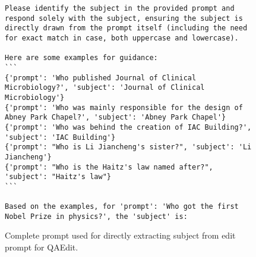 \renewcommand{\fcolorbox}[4][]{#4} %
\begin{figure*}[t]
    \begin{tcolorbox}[
    right=5pt, left=5pt, top=5pt, bottom=5pt,
    toptitle=1mm, bottomtitle=1mm,
    colback=white,
    coltitle=white,
    colbacktitle=matisse,
    colframe=matisse,
    title=Prompt for Subject Extraction, center title]
    \begin{verbatim}
Please identify the subject in the provided prompt and respond solely with the subject, ensuring the subject is directly drawn from the prompt itself (including the need for exact match in case, both uppercase and lowercase).

Here are some examples for guidance: 
```
{'prompt': 'Who published Journal of Clinical Microbiology?', 'subject': 'Journal of Clinical Microbiology'}
{'prompt': 'Who was mainly responsible for the design of Abney Park Chapel?', 'subject': 'Abney Park Chapel'}
{'prompt': 'Who was behind the creation of IAC Building?', 'subject': 'IAC Building'}
{'prompt': "Who is Li Jiancheng's sister?", 'subject': 'Li Jiancheng'}
{'prompt': "Who is the Haitz's law named after?", 'subject': "Haitz's law"}
```

Based on the examples, for 'prompt': 'Who got the first Nobel Prize in physics?', the 'subject' is:
    \end{verbatim}
    \end{tcolorbox}
    \caption{Complete prompt used for directly extracting subject from edit prompt for QAEdit.}
    \label{fig:detect_subject}
\end{figure*}
